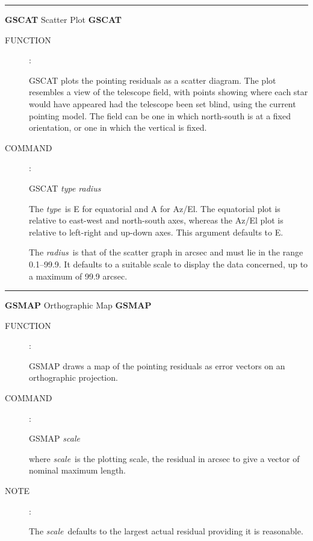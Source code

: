 \goodbreak
\rule{\textwidth}{0.3mm}
{\Large {\bf GSCAT} \hfill Scatter Plot \hfill {\bf GSCAT}}
\begin{description}
\item [FUNCTION]:

GSCAT plots the pointing residuals as a scatter
diagram.  The plot resembles a view of the telescope field, with
points showing where each star would have appeared had
the telescope been set blind, using the current pointing model.
The field can be one in which north-south is at a fixed orientation, or
one in which the vertical is fixed.

\item [COMMAND]:

\begin{cmd}
\> \> GSCAT {\it type radius}
\end{cmd}

The {\it type}\, is E for equatorial and A for Az/El.  The equatorial
plot is relative to east-west and north-south axes,
whereas the Az/El plot
is relative to left-right and up-down axes.  This argument
defaults to E.

The {\it radius}\, is that of the scatter graph in arcsec and
must lie in the range 0.1--99.9.  It defaults to a suitable scale to
display the data concerned, up to a maximum of 99.9 arcsec.

\end{description}


\goodbreak
\rule{\textwidth}{0.3mm}
{\Large {\bf GSMAP} \hfill Orthographic Map \hfill {\bf GSMAP}}
\begin{description}
\item [FUNCTION]:

GSMAP draws a map of the pointing residuals as
error vectors on an orthographic projection.

\item [COMMAND]:

\begin{cmd}
\> \> GSMAP {\it scale}
\end{cmd}

where {\it scale}\, is the plotting scale, the residual in arcsec to
give a vector of nominal maximum length.

\item [NOTE]:

The {\it scale}\, defaults to the largest actual residual providing
it is reasonable.

\end{description}

